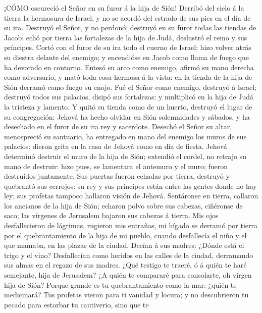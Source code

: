  ¡CÓMO oscureció el Señor en su furor á la hija de Sión!
Derribó del cielo á la tierra la hermosura de Israel, y no se acordó del
estrado de sus pies en el día de su ira.  Destruyó el Señor,
y no perdonó; destruyó en su furor todas las tiendas de Jacob: echó por
tierra las fortalezas de la hija de Judá, deslustró el reino y sus
príncipes.  Cortó con el furor de su ira todo el cuerno de
Israel; hizo volver atrás su diestra delante del enemigo; y encendióse
en Jacob como llama de fuego que ha devorado en contorno. 
Entesó su arco como enemigo, afirmó su mano derecha como adversario, y
mató toda cosa hermosa á la vista: en la tienda de la hija de Sión
derramó como fuego su enojo.  Fué el Señor como enemigo,
destruyó á Israel; destruyó todos sus palacios, disipó sus fortalezas: y
multiplicó en la hija de Judá la tristeza y lamento.  Y
quitó su tienda como de un huerto, destruyó el lugar de su congregación:
Jehová ha hecho olvidar en Sión solemnidades y sábados, y ha desechado
en el furor de su ira rey y sacerdote.  Desechó el Señor su
altar, menospreció su santuario, ha entregado en mano del enemigo los
muros de sus palacios: dieron grita en la casa de Jehová como en día de
fiesta.  Jehová determinó destruir el muro de la hija de
Sión; extendió el cordel, no retrajo su mano de destruir: hizo pues, se
lamentara el antemuro y el muro; fueron destruídos juntamente.
 Sus puertas fueron echadas por tierra, destruyó y quebrantó
sus cerrojos: su rey y sus príncipes están entre las gentes donde no hay
ley; sus profetas tampoco hallaron visión de Jehová. 
Sentáronse en tierra, callaron los ancianos de la hija de Sión; echaron
polvo sobre sus cabezas, ciñéronse de saco; las vírgenes de Jerusalem
bajaron sus cabezas á tierra.  Mis ojos desfallecieron de
lágrimas, rugieron mis entrañas, mi hígado se derramó por tierra por el
quebrantamiento de la hija de mi pueblo, cuando desfallecía el niño y el
que mamaba, en las plazas de la ciudad.  Decían á sus
madres: ¿Dónde está el trigo y el vino? Desfallecían como heridos en las
calles de la ciudad, derramando sus almas en el regazo de sus madres.
 ¿Qué testigo te traeré, ó á quién te haré semejante, hija
de Jerusalem? ¿A quién te compararé para consolarte, oh virgen hija de
Sión? Porque grande es tu quebrantamiento como la mar: ¿quién te
medicinará?  Tus profetas vieron para ti vanidad y locura;
y no descubrieron tu pecado para estorbar tu cautiverio, sino que te
